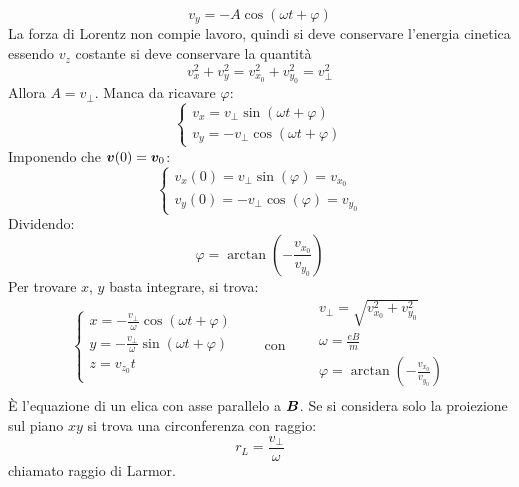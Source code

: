 \begin{Es}
  \[v_y=-A\cos\left(\omega t+\varphi\right)\]
  La forza di Lorentz non compie lavoro, quindi si deve conservare l'energia cinetica essendo $v_z$ costante si deve conservare la quantità
  \[v_x^2+v_y^2=v_{x_0}^2+v_{y_0}^2=v_\perp^2\]
  Allora $A=v_\perp$. Manca da ricavare $\varphi$:
  \[\left\{\begin{array}{l}
      v_x=v_\perp\sin\left(\omega t+\varphi\right) \\
      v_y=-v_\perp\cos\left(\omega t+\varphi\right)
    \end{array}\right.\]
  Imponendo che $\boldsymbol{v}(0)=\boldsymbol{v}_0$:
  \[\left\{\begin{array}{l}
      v_x(0)=v_\perp\sin\left(\varphi\right)=v_{x_0} \\
      v_y(0)=-v_\perp\cos\left(\varphi\right)=v_{y_0}
    \end{array}\right.\]
  Dividendo:
  \[\varphi=\arctan{\left(-\frac{v_{x_0}}{v_{y_0}}\right)}\]
  Per trovare $x$, $y$ basta integrare, si trova:
  \[\left\{
    \begin{array}{l}
      x=-\frac{v_\perp}{\omega}\cos\left(\omega t+\varphi\right) \\
      y=-\frac{v_\perp}{\omega}\sin\left(\omega t+\varphi\right) \\
      z=v_{z_0}t                                                 \\
    \end{array}\right.\qquad\text{con}\qquad
    \begin{array}{l}
      v_\perp=\sqrt{v_{x_0}^2+v_{y_0}^2}                     \\
      \omega=\frac{eB}{m}                                    \\
      \varphi=\arctan{\left(-\frac{v_{x_0}}{v_{y_0}}\right)} \\
    \end{array}\]
  \`E l'equazione di un elica con asse parallelo a $\boldsymbol{B}$. Se si considera solo la proiezione sul piano $xy$ si trova una circonferenza con raggio:
  \[r_L=\frac{v_\perp}{\omega}\]
  chiamato raggio di Larmor.
\end{Es}
